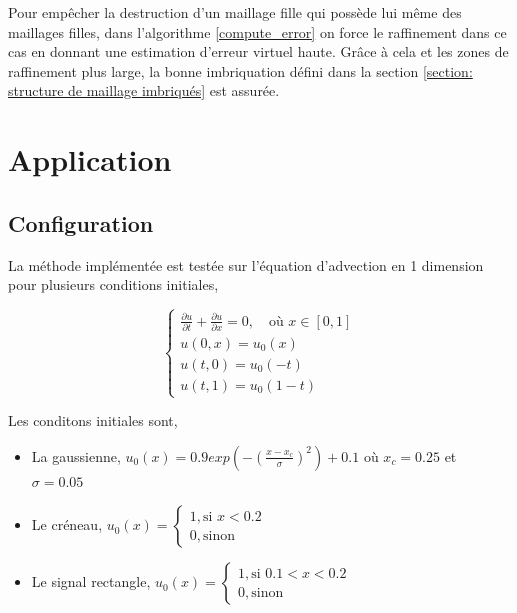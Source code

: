 \documentclass[12pt]{article}
\begin{document}
\begin{algorithm}
    \caption{Raffinement d'un niveau}
    \label{refine_level}
    
\end{algorithm}

Pour empêcher la destruction d'un maillage fille qui possède lui même des maillages filles, dans l'algorithme \ref{compute_error} on force le raffinement dans ce cas en donnant une estimation d'erreur virtuel haute.
Grâce à cela et les zones de raffinement plus large, la bonne imbriquation défini dans la section \ref{section: structure de maillage imbriqués} est assurée.

\begin{algorithm}
    \caption{Estimateur d'erreur}
    \label{compute_error}
    
\end{algorithm}

\section{Application}
\subsection{Configuration}
\label{section: configuration}
La méthode implémentée est testée sur l'équation d'advection en 1 dimension pour plusieurs conditions initiales,

\begin{equation}
    \begin{cases}
            \frac{\partial u}{\partial t} + \frac{\partial u}{\partial x} = 0, \quad \text{où } x \in [0, 1] \\
            u(0, x) = u_0(x) \\
            u(t, 0) = u_0(-t)\\
            u(t, 1) = u_0(1-t)
    \end{cases}
\end{equation}

Les conditons initiales sont, 
\begin{itemize}
    \item La gaussienne, \(u_0(x) = 0.9exp(-(\frac{x - x_c}{\sigma})^2) + 0.1\) où \(x_c  = 0.25\) et \(\sigma = 0.05\)
    \item Le créneau, \( u_0(x) = \begin{cases} 1, \text{si } x < 0.2 \\ 0, \text{sinon} \end{cases} \)
    \item Le signal rectangle, \( u_0(x) = \begin{cases} 1, \text{si } 0.1 < x < 0.2 \\ 0, \text{sinon} \end{cases} \)
\end{itemize}
\end{document}
